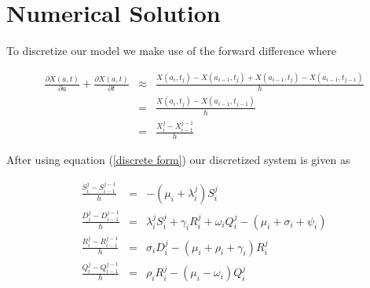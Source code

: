 % 
% 
% 
 
\section{Numerical Solution}
To discretize our model we make use of the forward difference where

\begin{eqnarray}\label{discrete form}
\frac{\partial X(a,t)}{\partial a} + \frac{\partial X(a,t)}{\partial t} & \approx & \frac{X(a_{i},t_{j})-X(a_{i-1}, t_{j}) + X(a_{i-1},t_{j})-X(a_{i-1},t_{j-1})}{h} \nonumber \\ 
& = & \frac{X(a_{i},t_{j})-X(a_{i-1}, t_{j-1})}{h} \\
& = & \frac{X^{j}_{i}-X^{j-1}_{i-1}}{h} \nonumber
\end{eqnarray}

After using equation (\ref{discrete form}) our discretized system is given as 

\begin{eqnarray}\label{dis 1} 
\frac{S_{i}^{j}-S_{i-1}^{j-1} }{h} & = & -(\mu_{i} + \lambda_{i}^{j})S_{i}^{j} \nonumber \\
\frac{D_{i}^{j}-D_{i-1}^{j-1} }{h} & = & \lambda^{j}_{i} S_{i}^{j} + \gamma _{i}R_{i}^{j} + \omega_{i} Q_{i}^{j}-(\mu_i + \sigma_i + \psi_i) \nonumber \\
\frac{R_{i}^{j}-R_{i-1}^{j-1} }{h} & = & \sigma_i D_{i}^{j}-(\mu_i + \rho_i + \gamma_i)R_{i}^{j} \\
\frac{Q_{i}^{j}-Q_{i-1}^{j-1} }{h} & = & \rho_{i} R_{i}^{j} -(\mu_i-\omega_i)Q^{j}_{i} \nonumber 
\end{eqnarray}

